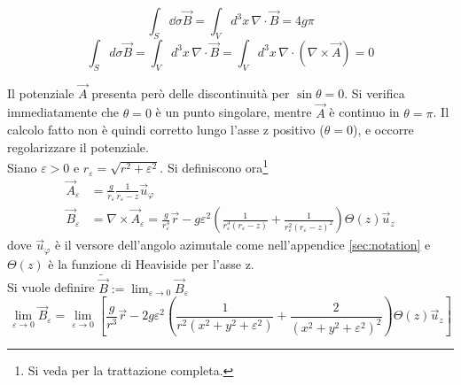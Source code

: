 \begin{equation}\label{eq:B4gpi}
   \int_S \dd\sigma \vec B = \int_V d^3 x \, \nabla \cdot \vec B = 4g\pi
\end{equation}
\begin{equation}
   \int_S d\sigma  \vec B = \int_V d^3 x \, \nabla \cdot \vec B
      = \int_V d^3 x \, \nabla \cdot (\nabla \times \vec A) = 0
\end{equation}

Il potenziale $\vec A$ presenta però delle discontinuità per $\sin\theta = 0$.
Si verifica immediatamente che $\theta = 0$ è un punto singolare, mentre $\vec A$
è continuo in $\theta = \pi$. Il calcolo fatto non è quindi corretto lungo l'asse z
positivo ($\theta = 0$), e occorre regolarizzare il potenziale.\\
Siano $\varepsilon > 0$  e $r_\varepsilon = \sqrt{r^2 + \varepsilon^2}$.
Si definiscono ora\footnote{Si veda \cite{shnir} per la trattazione completa.}
%
\begin{align*}
   \vec A_\varepsilon &= \frac{g}{r_\varepsilon}\frac{1}{r_\varepsilon - z} \vec u _\varphi  \\
   \vec B _\varepsilon & = \nabla \times \vec A_\varepsilon = \frac{g}{r_\varepsilon^3}\vec r
      - g\varepsilon^2 \left( \frac{1}{r_\varepsilon^3(r_\varepsilon - z)}
         + \frac{1}{r_\varepsilon^2(r_\varepsilon-z)^2} \right) \Theta(z) \vec u _z
\end{align*}
%
dove $\vec u _\varphi $ è il versore dell'angolo azimutale come nell'appendice
\ref{sec:notation} e $\Theta(z)$ è la funzione di Heaviside per l'asse z.\\
Si vuole definire $\tilde{\vec B} := \lim_{\varepsilon \to 0} \vec B _\varepsilon$
%
$$
   \lim_{\varepsilon \to 0} \vec B_\varepsilon = \lim_{\varepsilon \to 0} \left[
      \frac{g}{r^3}\vec r - 2g\varepsilon^2 \left( \frac{1}{r^2(x^2 + y^2 + \varepsilon^2)}
            + \frac{2}{(x^2 + y^2 + \varepsilon^2)^2} \right) \Theta(z) \vec u _z \right]
$$
%

